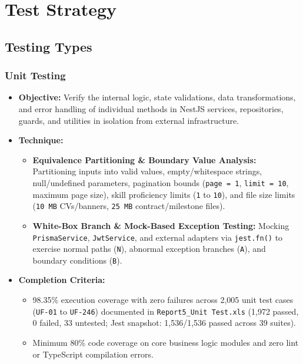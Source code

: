 \documentclass[12pt,a4paper]{article}
\begin{document}
\section{Test Strategy}

\subsection{Testing Types}

\subsubsection{Unit Testing}
\begin{itemize}
  \item \textbf{Objective:} Verify the internal logic, state validations, data transformations, and error handling of individual methods in NestJS services, repositories, guards, and utilities in isolation from external infrastructure.
  \item \textbf{Technique:}
  \begin{itemize}
    \item \textbf{Equivalence Partitioning \& Boundary Value Analysis:} Partitioning inputs into valid values, empty/whitespace strings, null/undefined parameters, pagination bounds (\texttt{page = 1}, \texttt{limit = 10}, maximum page size), skill proficiency limits (\texttt{1} to \texttt{10}), and file size limits (\texttt{10~MB} CVs/banners, \texttt{25~MB} contract/milestone files).
    \item {\sloppy\textbf{White-Box Branch \& Mock-Based Exception Testing:} Mocking \texttt{Prisma\allowbreak Service}, \texttt{Jwt\allowbreak Service}, and external adapters via \texttt{jest.fn()} to exercise normal paths (\texttt{N}), abnormal exception branches (\texttt{A}), and boundary conditions (\texttt{B}).}
  \end{itemize}
  \item \textbf{Completion Criteria:}
  \begin{itemize}
    \item 98.35\% execution coverage with zero failures across 2,005 unit test cases (\texttt{UF-01} to \texttt{UF-246}) documented in \texttt{Report5\_Unit Test.xls} (1,972 passed, 0 failed, 33 untested; Jest snapshot: 1,536/1,536 passed across 39 suites).
    \item Minimum 80\% code coverage on core business logic modules and zero lint or TypeScript compilation errors.
  \end{itemize}
\end{itemize}
\end{document}
